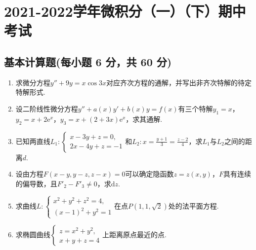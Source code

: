 \documentclass[../main.tex]{subfiles}
\begin{document}
\chapter{2021-2022学年微积分（一）（下）期中考试}

\section{基本计算题(每小题 6 分，共 60 分)}
\begin{enumerate}
    \item 求微分方程$y''+9y=x\cos 3x$对应齐次方程的通解，并写出非齐次特解的待定特解形式.
          \vspace{10em}

    \item 设二阶线性微分方程$y''+a(x)y'+b(x)y=f(x)$有三个特解$y_{1}=x$，$y_{2}=x+
              2\mathrm{e}^{x}$，$y_{3}=x+(2+3x)\mathrm{e}^{x}$，求其通解.
          \vspace{11em}

    \item 已知两直线$L_{1}:
              \begin{cases}
                  x-3y+z=0, \\
                  2x-4y+z=-1
              \end{cases}$和$L_{2}:x=\frac{y+1}{3}=\frac{z-2}{4}$，求$L_{1}$与$L_{2}$之间的距离$d$.
          \vspace{11em}

    \item 设由方程$F(x-y,y-z,z-x)=0$可以确定隐函数$z=z(x,y)$，$F$具有连续的偏导数，且$F
              '_{2}-F'_{3}\neq0$，求$\mathrm{d}z$.
          \vspace{13em}

    \item 求曲线$L:
              \begin{cases}
                  x^{2}+y^{2}+z^{2}=4, \\
                  (x-1)^{2}+y^{2}=1
              \end{cases}$在点$P\left(1,1,\sqrt{2}\right)$处的法平面方程.
          \vspace{12em}

    \item 求椭圆曲线$\begin{cases}
                  z=x^{2}+y^{2}, \\
                  x+y+z=4
              \end{cases}$上距离原点最近的点.
          \vspace{12em}


\end{enumerate}
\end{document}
